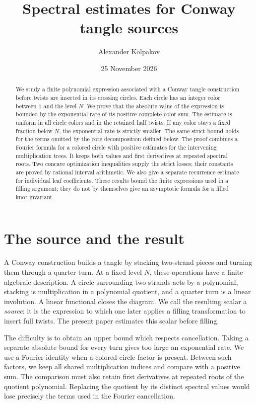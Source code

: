 \documentclass[11pt]{article}
\title{Spectral estimates for Conway tangle sources}
\author{Alexander Kolpakov}
\date{25 November 2026}
\theoremstyle{remark}\newtheorem{remark}[theorem]{Remark}
\numberwithin{equation}{section}
\begin{document}
\maketitle
\begin{abstract}
We study a finite polynomial expression associated with a Conway tangle
construction before twists are inserted in its crossing circles. Each
circle has an integer color between $1$ and the level $N$. We prove that
the absolute value of the expression is bounded by the exponential rate
of its positive complete-color sum. The estimate is uniform in all circle
colors and in the retained half twists. If any color stays a fixed
fraction below $N$, the exponential rate is strictly smaller. The same
strict bound holds for the terms omitted by the core decomposition defined below. The proof combines a Fourier formula for a colored circle
with positive estimates for the intervening multiplication trees. It
keeps both values and first derivatives at repeated spectral roots.
Two concave optimization inequalities supply the strict losses; their
constants are proved by rational interval arithmetic. We also give a
separate recurrence estimate for individual leaf coefficients. These
results bound the finite expressions used in a filling argument; they do
not by themselves give an asymptotic formula for a filled knot invariant.
\end{abstract}

\section{The source and the result}\label{cs:intro}

A Conway construction builds a tangle by stacking two-strand pieces and
turning them through a quarter turn. At a fixed level $N$, these operations
have a finite algebraic description. A circle surrounding two strands
acts by a polynomial, stacking is multiplication in a polynomial quotient,
and a quarter turn is a linear involution. A linear functional closes the
diagram. We call the resulting scalar a \emph{source}: it is the expression
to which one later applies a filling transformation to insert full twists.
The present paper estimates this scalar before filling.

The difficulty is to obtain an upper bound which respects cancellation.
Taking a separate absolute bound for every turn gives too large an
exponential rate. We use a Fourier identity when a colored-circle factor
is present. Between such factors, we keep all shared multiplication
indices and compare with a positive sum. The comparison must also retain
first derivatives at repeated roots of the quotient polynomial. Replacing
the quotient by its distinct spectral values would lose precisely the
terms used in the Fourier cancellation.
\end{document}
